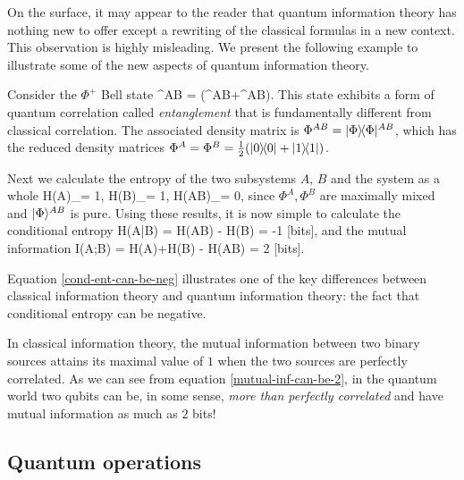 \documentclass[aps,11pt,twoside,letterpaper]{article}
\begin{document}
			
			On the surface, it may appear to the reader that quantum information theory has nothing new to offer except 
			a rewriting of the classical formulas in a new context.
			This observation is highly misleading.
			We present the following example to illustrate some of the new aspects of quantum information theory.
			
			\begin{example}	\label{example:EPR-pair}
				Consider the $\Phi^{+}$\! Bell state 
				\be
					\ket{\Phi}^{AB} = (^{AB}+^{AB}).
				\ee
				This state exhibits a form of quantum correlation called \emph{entanglement} that is fundamentally
				different from classical correlation.
				The associated density matrix is $\Phi^{AB} = | \Phi \rangle\!\langle \Phi |^{AB}$, which has
				the reduced density matrices $\Phi^A = \Phi^B = \tfrac{1}{2}(| 0 \rangle\!\langle 0 | + | 1 \rangle\!\langle 1 |)$.
				
				Next we calculate the entropy of the two subsystems $A$, $B$ and the system as a whole 
				\be
					H(A)_\Phi = 1, 	\qquad
					H(B)_\Phi = 1, 	\qquad
					H(AB)_\Phi = 0,
				\ee
				since $\Phi^A,\Phi^B$ are maximally mixed and $| \Phi \rangle^{AB}$ is pure.
				Using these results, it is now simple to calculate the conditional entropy
				\be	\label{cond-ent-can-be-neg}
					H(A|B)	=	H(AB) - H(B)	= -1 \textup{ [bits]},
				\ee
				and the mutual information
				\be	\label{mutual-inf-can-be-2}
					I(A;B)	=	H(A)+H(B) - H(AB)	= 2 \textup{ [bits]}.
				\ee
			\end{example}
			
			Equation \eqref{cond-ent-can-be-neg} illustrates one of the key differences between classical information
			theory and quantum information theory: the fact that conditional entropy can be negative.
			
			In classical information theory, the mutual information between two binary sources attains its maximal value
			of $1$ when the two sources are perfectly correlated. As we can see from equation 
			\eqref{mutual-inf-can-be-2}, in the quantum world two qubits can be, in some sense,
			\emph{more than perfectly correlated} and have mutual information as much as $2$ bits!
			

		\subsection{Quantum operations}	
\end{document}
